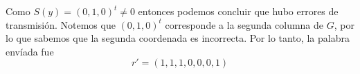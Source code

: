 \documentclass[letterpaper,10pt]{article}
\begin{document}
\begin{enumerate}
\begin{enumerate}
        Como $S(y) = (0, 1, 0)^{t} \neq 0$ entonces podemos concluir que hubo
        errores de transmisión. Notemos que $(0, 1, 0)^{t}$ corresponde a la 
        segunda columna de $G$, por lo que sabemos que la segunda coordenada es
        incorrecta. Por lo tanto, la palabra envíada fue
        \begin{equation*}
            r' = (1, 1, 1, 0, 0, 0, 1)
        \end{equation*}
    \end{enumerate}
\end{enumerate}
\end{document}
